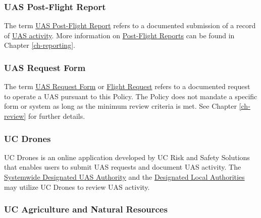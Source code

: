 \documentclass[
]{book}
\begin{document}
\hypertarget{postflight}{%
\subsubsection*{UAS Post-Flight Report}\label{postflight}}

The term \protect\hyperlink{postflight}{UAS Post-Flight Report} refers to a documented submission of a record of \protect\hyperlink{UASactivity}{UAS activity}. More information on \protect\hyperlink{postflight}{Post-Flight Reports} can be found in Chapter \ref{ch-reporting}.







\hypertarget{FR}{%
\subsubsection*{UAS Request Form}\label{FR}}

The term \protect\hyperlink{FR}{UAS Request Form} or \protect\hyperlink{FR}{Flight Request} refers to a documented request to operate a UAS pursuant to this Policy. The Policy does not mandate a specific form or system as long as the minimum review criteria is met. See Chapter \ref{ch-review} for further details.





\hypertarget{UCDrones}{%
\subsubsection*{UC Drones}\label{UCDrones}}

UC Drones is an online application developed by UC Risk and Safety Solutions that enables users to submit UAS requests and document UAS activity. The \protect\hyperlink{SDA}{Systemwide Designated UAS Authority} and the \protect\hyperlink{DLA}{Designated Local Authorities} may utilize UC Drones to review UAS activity.



\hypertarget{ANR}{%
\subsubsection*{UC Agriculture and Natural Resources}\label{ANR}}
\end{document}
